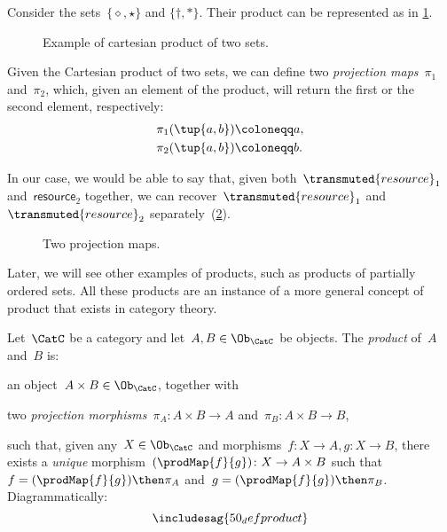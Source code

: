 \begin{example}
Consider the sets~$\{\diamond,\star\}$ and $\{\dagger, \ast\}$. Their product can be represented as in \cref{fig:cartesian-product}.
\begin{figure}[h!]
    \centering
    \caption{Example of cartesian product of two sets.\label{fig:cartesian-product}}
\end{figure}
\end{example}

Given the Cartesian product of two sets, we can define two \emph{projection maps}~$\pi_1$ and~$\pi_2$, which, given an element of the product, will return the first or the second element, respectively:
\begin{equation}
\begin{aligned}
    \pi_1(\tup{a,b}) &\coloneqq a,\\
    \pi_2(\tup{a,b}) &\coloneqq b.
\end{aligned}
\end{equation}

In our case, we would be able to say that, given both~$\transmuted{resource}_1$ and~$\textsf{resource}_2$ together, we can recover~$\transmuted{resource}_1$ and~$\transmuted{resource}_2$ separately~(\cref{fig:resource-product}).

\begin{figure}[h!]
    \centering
    \caption{Two projection maps. \label{fig:resource-product}}
\end{figure}


Later, we will see other examples of products, such as products of partially ordered sets.
All these products are an instance of a more general concept of product that exists in category
theory.
 

\begin{ctdefinition}
Let~$\CatC$ be a category and let~$A,B\in \Ob_{\CatC}$ be objects. The \emph{product} of~$A$ and~$B$ is:
\begin{compactenum}
    \item an object~$A \times B \in \Ob_{\CatC}$, together with
    \item two \emph{projection morphisms}~$\pi_A \colon A \times B \to A$ and~$\pi_B \colon A \times B \to B$,
\end{compactenum} 
such that, given any~$X \in \Ob_{\CatC}$ and morphisms~$f \colon X \to A, g \colon X \to B$, there exists a \emph{unique} morphism~$(\prodMap{f}{g}) \colon X \to A \times B$ such that~$f = (\prodMap{f}{g})\then \pi_A$ and~$g=(\prodMap{f}{g})\then \pi_B$. Diagrammatically:
\begin{equation}
\includesag{50_defproduct}
\end{equation}
\end{ctdefinition} 

